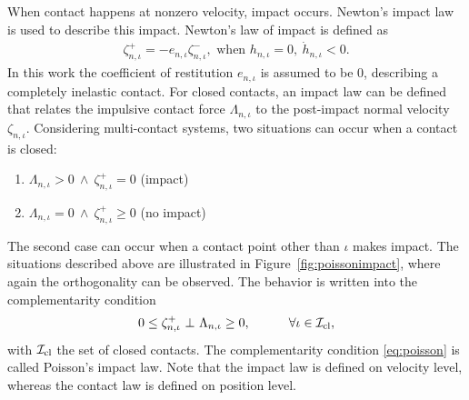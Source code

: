 \documentclass[../DC2017114Bouma.tex]{subfiles}
\begin{document}
When contact happens at nonzero velocity, impact occurs. Newton's impact law is used to describe this impact. Newton's law of impact is defined as
\begin{align}
\zeta^+_{n,\iota} = -e_{n,\iota}\zeta^-_{n,\iota},\text{ when }h_{n,\iota}=0,\ \dot{h}_{n,\iota}<0.
\end{align}
%
%
In this work the coefficient of restitution $e_{n,\iota}$ is assumed to be $0$, describing a completely inelastic contact. For closed contacts, an impact law can be defined that relates the impulsive contact force $\Lambda_{n,\iota}$ to the post-impact normal velocity $\zeta_{n,\iota}$. Considering multi-contact systems, two situations can occur when a contact is closed:
\begin{enumerate}
\item $\Lambda_{n,\iota} > 0\ \wedge\ \zeta^+_{n,\iota} = 0$ (impact)
\item $\Lambda_{n,\iota} = 0\ \wedge\ \zeta^+_{n,\iota} \geq 0$ (no impact)
\end{enumerate}
The second case can occur when a contact point other than $\iota$ makes impact. The situations described above are illustrated in Figure~\ref{fig:poissonimpact}, where again the orthogonality can be observed. The behavior is written into the complementarity condition
\begin{align}
0\leq \zeta^+_{n,\iota}\ \bot\ \Lambda_{n,\iota} \geq 0,\quad  \qquad \forall \iota\in\mathcal{I}_{\text{cl}},\label{eq:poisson}
\end{align}
with $\mathcal{I}_{\text{cl}}$ the set of closed contacts. The complementarity condition \eqref{eq:poisson} is called Poisson's impact law. Note that the impact law is defined on velocity level, whereas the contact law is defined on position level.
\end{document}
